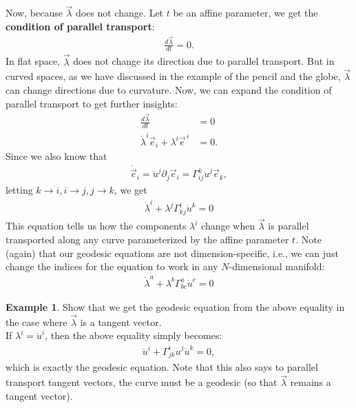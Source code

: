 \documentclass{book}
\theoremstyle{definition}
\newtheorem{exmp}{Example}[section]
\begin{document}
Now, because $\vec{\lambda}$ does not change. Let $t$ be an affine parameter, we get the \textbf{condition of parallel transport}:
\begin{align*}
\frac{d\vec{\lambda}}{dt} = 0.
\end{align*}  
In flat space, $\vec{\lambda}$ does not change its direction due to parallel transport. But in curved spaces, as we have discussed in the example of the pencil and the globe, $\vec{\lambda}$ can change directions due to curvature. Now, we can expand the condition of parallel transport to get further insights: 
\begin{align*}
\frac{d\vec{\lambda}}{dt} &= 0\\
\dot{\lambda}^i \vec{e}_i + \lambda^i\vec{e}^{\,i} &= 0.
\end{align*}
Since we also know that
\begin{align*}
\dot{\vec{e}}_i = \dot{u}^j\partial_j\vec{e}_i = \Gamma^k_{ij}\dot{u}^j\vec{e}_k,
\end{align*}
letting $k\rightarrow i, i \rightarrow j, j \rightarrow k$, we get
\begin{align*}
\dot{\lambda}^i + \lambda^j \Gamma^i_{kj}\dot{u}^k = 0
\end{align*}
This equation tells us how the components $\lambda^i$ change when $\vec{\lambda}$ is parallel transported along any curve parameterized by the affine parameter $t$. Note (again) that our geodesic equations are not dimension-specific, i.e., we can just change the indices for the equation to work in any $N$-dimensional manifold:
\begin{align*}
\boxed{\dot{\lambda}^a + \lambda^b \Gamma^a_{bc}\dot{u}^c = 0}
\end{align*}

\begin{exmp}
	Show that we get the geodesic equation from the above equality in the case where $\vec{\lambda}$ is a tangent vector.\\
	
	If $\lambda^i = \dot{u}^i$, then the above equality simply becomes:
	\begin{align*}
	\ddot{u}^i + \Gamma^i_{jk}\dot{u}^j\dot{u}^k = 0,
	\end{align*}
	which is exactly the geodesic equation. Note that this also says to parallel transport tangent vectors, the curve must be a geodesic (so that $\vec{\lambda}$ remains a tangent vector). 
\end{exmp}
\end{document}
